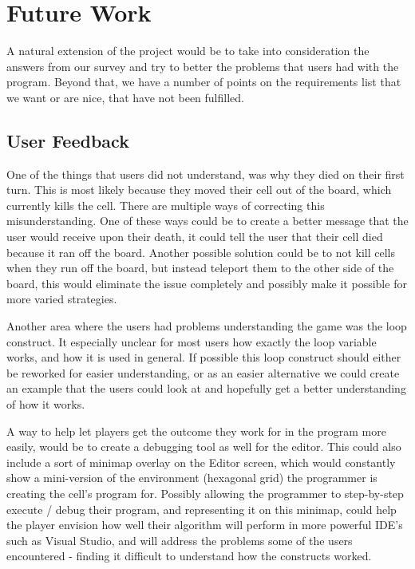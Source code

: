 \section{Future Work}
\label{sec:future_work}
A natural extension of the project would be to take into consideration the answers from our survey and try to better the problems that users had with the program. Beyond that, we have a number of points on the requirements list that we want or are nice, that have not been fulfilled.

\subsection{User Feedback}
One of the things that users did not understand, was why they died on their first turn. This is most likely because they moved their cell out of the board, which currently kills the cell. There are multiple ways of correcting this misunderstanding. One of these ways could be to create a better message that the user would receive upon their death, it could tell the user that their cell died because it ran off the board. Another possible solution could be to not kill cells when they run off the board, but instead teleport them to the other side of the board, this would eliminate the issue completely and possibly make it possible for more varied strategies.\newline

Another area where the users had problems understanding the game was the loop construct. It especially unclear for most users how exactly the loop variable works, and how it is used in general. If possible this loop construct should either be reworked for easier understanding, or as an easier alternative we could create an example that the users could look at and hopefully get a better understanding of how it works.


A way to help let players get the outcome they work for in the program more easily, would be to create a debugging tool as well for the editor. This could also include a sort of minimap overlay on the Editor screen, which would constantly show a mini-version of the environment (hexagonal grid) the programmer is creating the cell's program for. Possibly allowing the programmer to step-by-step execute / debug their program, and representing it on this minimap, could help the player envision how well their algorithm will perform in more powerful IDE's such as Visual Studio, and will address the problems some of the users encountered - finding it difficult to understand how the constructs worked.

